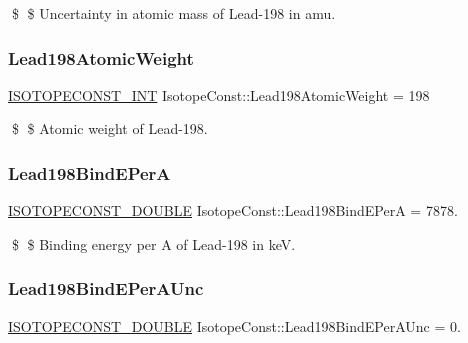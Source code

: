 \$ \$ Uncertainty in atomic mass of Lead-\/198 in amu. \mbox{\label{group___isotope_const-_lead-_pb198_gad4754e0ca20650dd5d44c94a9a2155c2}} 
\subsubsection{\texorpdfstring{Lead198\+Atomic\+Weight}{Lead198AtomicWeight}}
{\footnotesize\ttfamily \mbox{\hyperlink{group___isotope_const-_macros_ga5f18360b3e99483a35c32d789e62621c}{I\+S\+O\+T\+O\+P\+E\+C\+O\+N\+S\+T\+\_\+\+I\+NT}} Isotope\+Const\+::\+Lead198\+Atomic\+Weight = 198}

\$ \$ Atomic weight of Lead-\/198. \mbox{\label{group___isotope_const-_lead-_pb198_ga334d83502a9a12541f9a37f61acbe03c}} 
\subsubsection{\texorpdfstring{Lead198\+Bind\+E\+PerA}{Lead198BindEPerA}}
{\footnotesize\ttfamily \mbox{\hyperlink{group___isotope_const-_macros_ga8f45a7272ce02c0b4c65c44636ed719a}{I\+S\+O\+T\+O\+P\+E\+C\+O\+N\+S\+T\+\_\+\+D\+O\+U\+B\+LE}} Isotope\+Const\+::\+Lead198\+Bind\+E\+PerA = 7878.}

\$ \$ Binding energy per A of Lead-\/198 in keV. \mbox{\label{group___isotope_const-_lead-_pb198_ga70a0f8376a6bbe4b87b4c6e324198f19}} 
\subsubsection{\texorpdfstring{Lead198\+Bind\+E\+Per\+A\+Unc}{Lead198BindEPerAUnc}}
{\footnotesize\ttfamily \mbox{\hyperlink{group___isotope_const-_macros_ga8f45a7272ce02c0b4c65c44636ed719a}{I\+S\+O\+T\+O\+P\+E\+C\+O\+N\+S\+T\+\_\+\+D\+O\+U\+B\+LE}} Isotope\+Const\+::\+Lead198\+Bind\+E\+Per\+A\+Unc = 0.}


